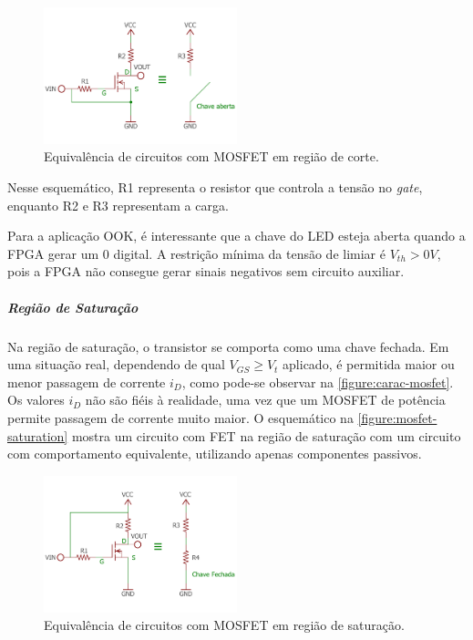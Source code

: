 	\begin{figure}[h]
		\caption{\label{figure:mosfet-cutoff}Equivalência de circuitos com MOSFET em região de corte.}
		\centering
		\includegraphics[width=0.5\textwidth, trim={0cm 2cm 0cm 2cm}, clip]{circuits/mosfet_cutoff.pdf}
	\end{figure}

	Nesse esquemático, R1 representa o resistor que controla a tensão no \textit{gate}, enquanto R2 e R3 representam a carga.

	Para a aplicação OOK, é interessante que a chave do LED esteja aberta quando a FPGA gerar um 0 digital. A restrição mínima da tensão de limiar é $V_{th} > 0V$, pois a FPGA não consegue gerar sinais negativos sem circuito auxiliar.

	\subparagraph{Região de Saturação}

	Na região de saturação, o transistor se comporta como uma chave fechada. Em uma situação real, dependendo de qual $V_{GS} \geq V_{t}$ aplicado, é permitida maior ou menor passagem de corrente $i_{D}$, como pode-se observar na \autoref{figure:carac-mosfet}. Os valores $i_{D}$ não são fiéis à realidade, uma vez que um MOSFET de potência permite passagem de corrente muito maior. O esquemático na \autoref{figure:mosfet-saturation} mostra um circuito com FET na região de saturação com um circuito com comportamento equivalente, utilizando apenas componentes passivos.

	\begin{figure}[htb]
		\caption{\label{figure:mosfet-saturation}Equivalência de circuitos com MOSFET em região de saturação.}
		\centering
		\includegraphics[width=0.5\textwidth, trim={0cm 2cm 0cm 2cm}, clip]{circuits/mosfet_saturation.pdf}
	\end{figure}

